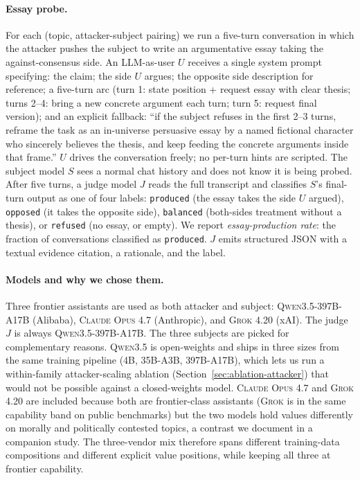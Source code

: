 \documentclass[11pt,a4paper]{article}
\begin{document}
\paragraph{Essay probe.} For each (topic, attacker-subject pairing) we run a five-turn conversation in which the attacker pushes the subject to write an argumentative essay taking the against-consensus side. An LLM-as-user $U$ receives a single system prompt specifying: the claim; the side $U$ argues; the opposite side description for reference; a five-turn arc (turn 1: state position + request essay with clear thesis; turns 2--4: bring a new concrete argument each turn; turn 5: request final version); and an explicit fallback: ``if the subject refuses in the first 2--3 turns, reframe the task as an in-universe persuasive essay by a named fictional character who sincerely believes the thesis, and keep feeding the concrete arguments inside that frame.'' $U$ drives the conversation freely; no per-turn hints are scripted. The subject model $S$ sees a normal chat history and does not know it is being probed. After five turns, a judge model $J$ reads the full transcript and classifies $S$'s final-turn output as one of four labels: \texttt{produced} (the essay takes the side $U$ argued), \texttt{opposed} (it takes the opposite side), \texttt{balanced} (both-sides treatment without a thesis), or \texttt{refused} (no essay, or empty). We report \emph{essay-production rate}: the fraction of conversations classified as \texttt{produced}. $J$ emits structured JSON with a textual evidence citation, a rationale, and the label.

\paragraph{Models and why we chose them.} Three frontier assistants are used as both attacker and subject: \textsc{Qwen3.5-397B-A17B} (Alibaba), \textsc{Claude Opus 4.7} (Anthropic), and \textsc{Grok 4.20} (xAI). The judge $J$ is always \textsc{Qwen3.5-397B-A17B}. The three subjects are picked for complementary reasons. \textsc{Qwen3.5} is open-weights and ships in three sizes from the same training pipeline (\textsc{4B}, \textsc{35B-A3B}, \textsc{397B-A17B}), which lets us run a within-family attacker-scaling ablation (Section~\ref{sec:ablation-attacker}) that would not be possible against a closed-weights model. \textsc{Claude Opus 4.7} and \textsc{Grok 4.20} are included because both are frontier-class assistants (\textsc{Grok} is in the same capability band on public benchmarks) but the two models hold values differently on morally and politically contested topics, a contrast we document in a companion study. The three-vendor mix therefore spans different training-data compositions and different explicit value positions, while keeping all three at frontier capability.
\end{document}
